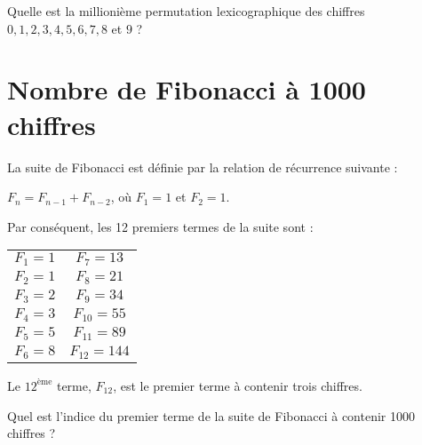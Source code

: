 Quelle est la millionième permutation lexicographique des chiffres $0, 1, 2, 3, 4, 5, 6, 7, 8$ et $9$ ?


\section{Nombre de Fibonacci à 1000 chiffres} \label{pb.025}
La suite de Fibonacci est définie par la relation de récurrence suivante :

\begin{center}
    $F_n = F_{n-1} + F_{n-2}$, où $F_1 = 1$ et $F_2 = 1$.
\end{center}

Par conséquent, les 12 premiers termes de la suite sont :

\begin{center}
    \begin{tabular}{cc}
        $F_1 = 1$ & $F_7 = 13$\\
        $F_2 = 1$ & $F_8 = 21$\\
        $F_3 = 2$ & $F_9 = 34$\\
        $F_4 = 3$ & $F_{10} = 55$\\
        $F_5 = 5$ & $F_{11} = 89$\\
        $F_6 = 8$ & $F_{12} = 144$\\
    \end{tabular}
\end{center}

Le $12^{\text{ème}}$ terme, $F_{12}$, est le premier terme à contenir trois chiffres.

Quel est l'indice du premier terme de la suite de Fibonacci à contenir 1000 chiffres ?
